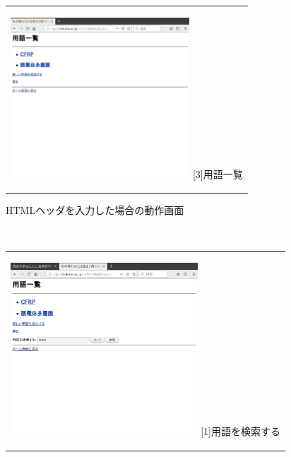 \documentclass[12pt,a4paper]{jarticle}
\begin{document}
\begin{ttfamily}
\begin{figure}[htbp]
\begin{center}
\begin{tabular}{c}
      \begin{minipage}{0.5\hsize}
        \begin{center}
          \includegraphics[width=6.7cm]{10-3-40.eps}
          \hspace{1.6cm} [3]用語一覧
        \end{center}
      \end{minipage}

    \end{tabular}
    \caption{HTMLヘッダを入力した場合の動作画面}
    \label{fig:b}
  \end{center}
\end{figure}

 \ \\
\begin{figure}[htbp]
  \begin{center}
    \begin{tabular}{c}

      \begin{minipage}{0.55\hsize}
        \begin{center}
          \includegraphics[width=7.0cm]{10-3-41.eps}
          \hspace{1.6cm} [1]用語を検索する
        \end{center}
      \end{minipage}


\end{tabular}
\end{center}
\end{figure}
\end{ttfamily}
\end{document}
